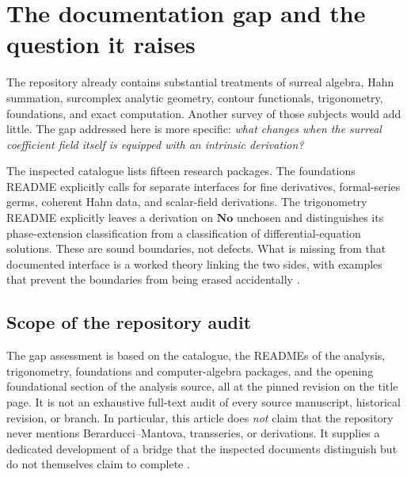 \documentclass[11pt,a4paper]{article}
\numberwithin{equation}{section}
\theoremstyle{definition}
\theoremstyle{remark}
\newcommand{\No}{\mathbf{No}}
\begin{document}
\section{The documentation gap and the question it raises}
\label{sec:gap}

The repository already contains substantial treatments of surreal algebra,
Hahn summation, surcomplex analytic geometry, contour functionals,
trigonometry, foundations, and exact computation. Another survey of those
subjects would add little. The gap addressed here is more specific:
\emph{what changes when the surreal coefficient field itself is equipped with
an intrinsic derivation?}

The inspected catalogue lists fifteen research packages. The foundations
README explicitly calls for separate interfaces for fine derivatives,
formal-series germs, coherent Hahn data, and scalar-field derivations.
The trigonometry README explicitly leaves a derivation on $\No$ unchosen
and distinguishes its phase-extension classification from a classification
of differential-equation solutions. These are sound boundaries, not defects.
What is missing from that documented interface is a worked theory linking the
two sides, with examples that prevent the boundaries from being erased
accidentally \cite{RepoMap,RepoFound,RepoTrig}.

\subsection{Scope of the repository audit}

The gap assessment is based on the catalogue, the READMEs of the analysis,
trigonometry, foundations and computer-algebra packages, and the opening
foundational section of the analysis source, all at the pinned revision on
the title page. It is not an exhaustive full-text audit of every source
manuscript, historical revision, or branch. In particular, this article does
\emph{not} claim that the repository never mentions Berarducci--Mantova,
transseries, or derivations. It supplies a dedicated development of a bridge
that the inspected documents distinguish but do not themselves claim to
complete \cite{RepoAnalysis,RepoCAS}.
\end{document}
